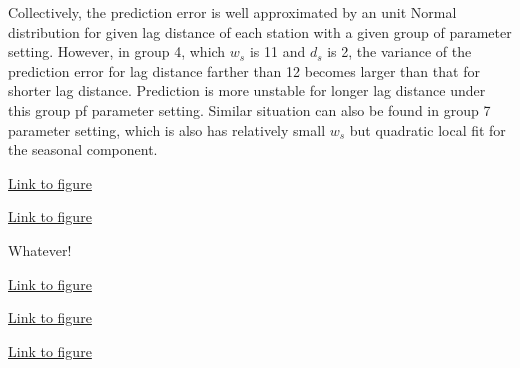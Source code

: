 Collectively, the prediction error is well approximated by an unit Normal
distribution for given lag distance of each station with a given group of
parameter setting. However, in group 4, which $w_s$ is 11 and $d_s$ is 2, the 
variance of the prediction error for lag distance farther than 12 becomes larger
than that for shorter lag distance. Prediction is more unstable for longer lag
distance under this group pf parameter setting. Similar situation can also be
found in group 7 parameter setting, which is also has relatively small $w_s$ but
quadratic local fit for the seasonal component.

\begin{framed}
\begin{center}
  \href{../plots/a1950/E4/tmax.absmeans.vs.lag.sw.pdf}{Link to figure}
  \label{e4.abserrorlag.sw}
\end{center}
\end{framed}

\begin{framed}
\begin{center}
  \href{../plots/a1950/E4/tmax.std.vs.lag.sw.pdf}{Link to figure}
  \label{e4.stderrorlag.sw}
\end{center}
\end{framed}

Whatever!

\begin{framed}
\begin{center}
  \href{../plots/a1950/E4/tmax.absmeans.vs.lag.sd.pdf}{Link to figure}
  \label{e4.abserrorlag.sd}
\end{center}
\end{framed}

\begin{framed}
\begin{center}
  \href{../plots/a1950/E4/tmax.std.vs.lag.sd.pdf}{Link to figure}
  \label{e4.stderrorlag.sd}
\end{center}
\end{framed}



\begin{framed}
\begin{center}
  \href{../plots/a1950/E4/tmax.mean.absmeans.error.sw.pdf}{Link to figure}
  \label{e4.abserror.sw}
\end{center}
\end{framed}

